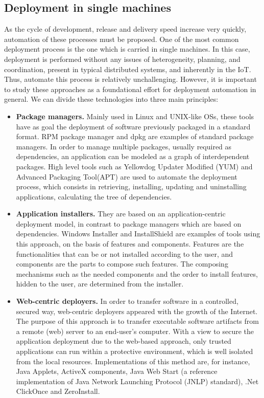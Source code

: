 \subsection{Deployment in single machines}
\label{subsec:singleDeployment}
As the cycle of development, release and delivery speed increase very quickly, automation of these processes must be proposed.
One of the most common deployment process is the one which is carried in single machines.
In this case, deployment is performed without any issues of heterogeneity, planning, and coordination, present in typical distributed systems, and inherently in the IoT.
Thus, automate this process is relatively unchallenging.
However, it is important to study these approaches as a foundational effort for deployment automation in general.
We can divide these technologies into three main principles:
\begin{itemize}
	\item \textbf{Package managers.} Mainly used in Linux and UNIX-like OSs, these tools have as goal the deployment of software previously packaged in a standard format. 
	RPM package manager and dpkg are examples of standard package managers.
	In order to manage multiple packages, usually required as dependencies, an application can be modeled as a graph of interdependent packages.
	High level tools such as Yellowdog Updater Modified (YUM) and Advanced Packaging Tool(APT) are used to automate the deployment process, which consists in retrieving, installing, updating and uninstalling applications, calculating the tree of dependencies.
	\item \textbf{Application installers.} They are based on an application-centric deployment model, in contrast to package managers which are based on dependencies.
	Windows Installer and InstallShield are examples of tools using this approach, on the basis of features and components.
	Features are the functionalities that can be or not installed according to the user, and components are the parts to compose such features.
	The composing mechanisms such as the needed components and the order to install features, hidden to the user, are determined from the installer.
	\item \textbf{Web-centric deployers.} In order to transfer software in a controlled, secured way, web-centric deployers appeared with the growth of the Internet.
	The purpose of this approach is to transfer executable software artifacts from a remote (web) server to an end-user's computer.
	With a view to secure the application deployment due to the web-based approach, only trusted applications can run within a protective environment, which is well isolated from the local resources.
	Implementations of this method are, for instance, Java Applets, ActiveX components, Java Web Start (a reference implementation of Java Network Launching Protocol (JNLP) standard), .Net ClickOnce and ZeroInstall.
\end{itemize}
